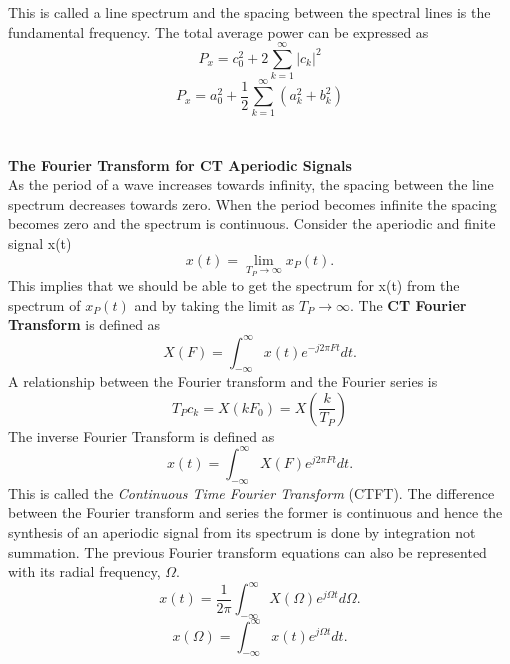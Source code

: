 \documentclass{article} %
\begin{document}
	This is called a line spectrum and the spacing between the spectral lines is the fundamental frequency. The total average power can be expressed as 
	\begin{equation}
 	P_x = c_0^2 + 2\sum_{k=1}^{\infty}|c_k|^2
	\end{equation}
	\begin{equation}
 	P_x = a_0^2 + \frac{1}{2}\sum_{k=1}^{\infty}(a_k^2 + b_k^2)
	\end{equation}
	\\
	\\
	\textbf{The Fourier Transform for CT Aperiodic Signals}\\
	As the period of a wave increases towards infinity, the spacing between the line spectrum decreases towards zero. When the period becomes
	infinite the spacing becomes zero and the spectrum is continuous. Consider the aperiodic and finite signal x(t)
	\begin{equation}
	x(t) = \lim_{T_P \rightarrow \infty}x_P(t).
	\end{equation}
	This implies that we should be able to get the spectrum for x(t) from the spectrum of $x_P(t)$ and by taking the limit as $T_P \rightarrow \infty$.
	The \textbf{CT Fourier Transform} is defined as
	\begin{equation}
	X(F) = \int_{-\infty}^{\infty}x(t)e^{-j2\pi Ft}dt.
	\end{equation}
	A relationship between the Fourier transform and the Fourier series is
	\begin{equation}
	T_Pc_k = X(kF_0) = X(\frac{k}{T_P})
	\end{equation}
	The inverse Fourier Transform is defined as 
	\begin{equation}
	x(t) = \int_{-\infty}^{\infty}X(F)e^{j2\pi Ft}dt.
	\end{equation}	
	This is called the \textit{Continuous Time Fourier Transform} (CTFT). The difference between the Fourier transform and series 
	the former is continuous and hence the synthesis of an aperiodic signal
	from its spectrum is done by integration not summation. The previous Fourier transform equations can also be represented
	with its radial frequency, $\Omega$.
	\begin{equation}
	x(t) = \frac{1}{2\pi}\int_{-\infty}^{\infty}X(\Omega)e^{j\Omega t}d \Omega.
	\end{equation}
	\begin{equation}
	x(\Omega) = \int_{-\infty}^{\infty}x(t)e^{j\Omega t}dt.
	\end{equation}
\end{document}
